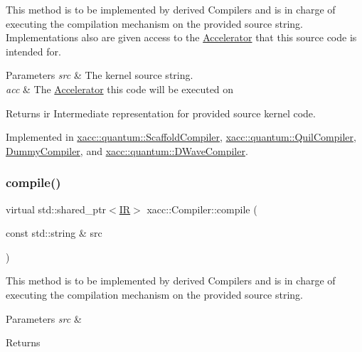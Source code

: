 This method is to be implemented by derived Compilers and is in charge of executing the compilation mechanism on the provided source string. Implementations also are given access to the \hyperlink{a01435}{Accelerator} that this source code is intended for.


\begin{DoxyParams}{Parameters}
{\em src} & The kernel source string. \\
\hline
{\em acc} & The \hyperlink{a01435}{Accelerator} this code will be executed on \\
\hline
\end{DoxyParams}
\begin{DoxyReturn}{Returns}
ir Intermediate representation for provided source kernel code. 
\end{DoxyReturn}


Implemented in \hyperlink{a01103_a7caede75bb2304ba405966651b115543}{xacc\+::quantum\+::\+Scaffold\+Compiler}, \hyperlink{a01075_a2421482415ca4e09963ea4ecddff8100}{xacc\+::quantum\+::\+Quil\+Compiler}, \hyperlink{a01139_a9eaa6e6a4ff3645915d166a325bfde8d}{Dummy\+Compiler}, and \hyperlink{a01115_a0f7f6b10b4a881cb27b36eaa6d39e7b1}{xacc\+::quantum\+::\+D\+Wave\+Compiler}.

\mbox{\label{a01451_a9092f5f779b570c91569b59621280c04}} 
\subsubsection{\texorpdfstring{compile()}{compile()}\hspace{0.1cm}{\footnotesize\ttfamily [2/2]}}
{\footnotesize\ttfamily virtual std\+::shared\+\_\+ptr$<$\hyperlink{a01499}{IR}$>$ xacc\+::\+Compiler\+::compile (\begin{DoxyParamCaption}\item[{const std\+::string \&}]{src }\end{DoxyParamCaption})\hspace{0.3cm}{\ttfamily [pure virtual]}}

This method is to be implemented by derived Compilers and is in charge of executing the compilation mechanism on the provided source string. 
\begin{DoxyParams}{Parameters}
{\em src} & \\
\hline
\end{DoxyParams}
\begin{DoxyReturn}{Returns}

\end{DoxyReturn}


